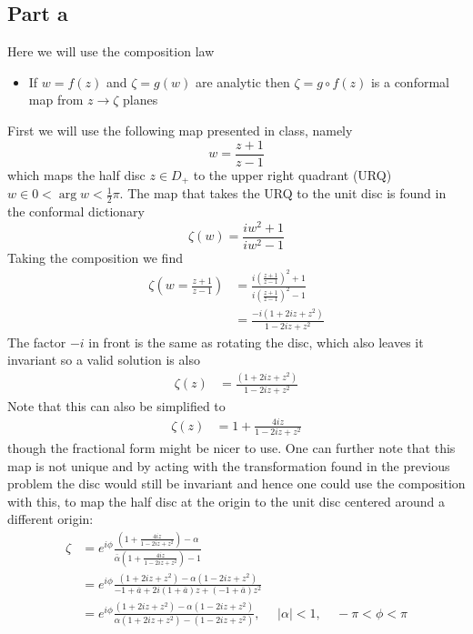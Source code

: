 \documentclass[a4paper,12pt]{article}
\begin{document}
\subsection*{Part a}
Here we will use the composition law
\begin{itemize}
	\item If $w=f(z)$ and $\zeta=g(w)$ are analytic then $\zeta= g\circ f(z)$ is a conformal map from $z\to \zeta$ planes
\end{itemize}
First we will use the following map presented in class, namely
\begin{equation}
w=\frac{z+1}{z-1}
\end{equation}
which maps the half disc $z\in D_+$ to the upper right quadrant (URQ) $w\in 0<\arg w <\frac{1}{2}\pi$. The map that takes the URQ to the unit disc is found in the conformal dictionary
\begin{equation}
 \zeta(w)=\frac{iw^2+1}{iw^2-1}
\end{equation}
Taking the composition we find
\begin{equation}
\begin{aligned}
\zeta(w=\frac{z+1}{z-1})&=\frac{i\left(\frac{z+1}{z-1}\right)^2+1}{i\left(\frac{z+1}{z-1}\right)^2-1}\\
&=\frac{-i\left(1+2iz+z^2\right)}{1-2iz+z^2}
\end{aligned}
\end{equation}
The factor $-i$ in front is the same as rotating the disc, which also leaves it invariant so a valid solution is also
\begin{equation}
	\begin{aligned}
		\zeta(z)
		&=\frac{\left(1+2iz+z^2\right)}{1-2iz+z^2}
	\end{aligned}
\end{equation}
Note that this can also be simplified to
\begin{equation}
	\begin{aligned}
		\zeta(z)
		&=1+\frac{4iz}{1-2iz+z^2}
	\end{aligned}
\end{equation}
though the fractional form might be nicer to use. One can further note that this map is not unique and by acting with the transformation found in the previous problem the disc would still be invariant and hence one could use the composition with this, to map the half disc at the origin to the unit disc centered around a different origin:
\begin{equation}
	\begin{aligned}
		\zeta 
		&=e^{i\phi}\frac{\left(1+\frac{4iz}{1-2iz+z^2}\right)-\alpha}{\bar \alpha \left(1+\frac{4iz}{1-2iz+z^2}\right)-1}\\
		&=e^{i\phi}\frac{\left(1+2iz+z^2\right)-\alpha(1-2iz+z^2)}{-1+\bar a+2i(1+\bar a)z+(-1+\bar a)z^2}
		\\
		&=e^{i\phi}\frac{\left(1+2iz+z^2\right)-\alpha(1-2iz+z^2)}{\alpha(1+2iz+z^2)-\left(1-2iz+z^2\right)},~~~~~~|\alpha|<1,~~~~~-\pi<\phi < \pi
	\end{aligned}
\end{equation}
\end{document}
